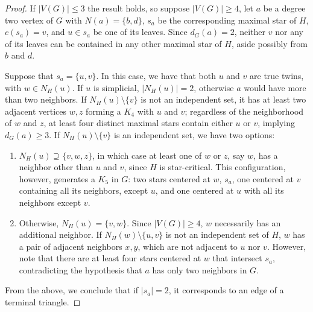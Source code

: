 \begin{proof}
    If $|V(G)| \leq 3$ the result holds, so suppose $|V(G)| \geq 4$, let $a$ be a degree two vertex of $G$ with $N(a) = \{b,d\}$, $s_a$ be the corresponding maximal star of $H$, $c(s_a) = v$, and $u \in s_a$ be one of its leaves.
    Since $d_G(a) = 2$, neither $v$ nor any of its leaves can be contained in any other maximal star of $H$, aside possibly from $b$ and $d$.
    
    Suppose that $s_a = \{u,v\}$.
    In this case, we have that both $u$ and $v$ are true twins, with $w \in N_H(u)$.
    If $u$ is simplicial, $|N_H(u)| = 2$, otherwise $a$ would have more than two neighbors.
    If $N_H(u) \setminus \{v\}$ is not an independent set, it has at least two adjacent vertices $w,z$ forming a $K_4$ with $u$ and $v$; regardless of the neighborhood of $w$ and $z$, at least four distinct maximal stars contain either $u$ or $v$, implying $d_G(a) \geq 3$.
    If $N_H(u) \setminus \{v\}$ is an independent set, we have two options:
    \begin{enumerate}
        \item $N_H(u) \supseteq \{v,w,z\}$, in which case at least one of $w$ or $z$, say $w$, has a neighbor other than $u$ and $v$, since $H$ is star-critical. This configuration, however, generates a $K_5$ in $G$: two stars centered at $w$, $s_a$, one centered at $v$ containing all its neighbors, except $u$, and one centered at $u$ with all its neighbors except $v$.
        \item Otherwise, $N_H(u) = \{v,w\}$. Since $|V(G)| \geq 4$, $w$ necessarily has an additional neighbor. If $N_H(w) \setminus \{u,v\}$ is not an independent set of $H$, $w$ has a pair of adjacent neighbors $x,y$, which are not adjacent to $u$ nor $v$.
        However, note that there are at least four stars centered at $w$ that intersect $s_a$, contradicting the hypothesis that $a$ has only two neighbors in $G$.
   \end{enumerate}
   From the above, we conclude that if $|s_a| = 2$, it corresponds to an edge of a terminal triangle.
   

\end{proof}
